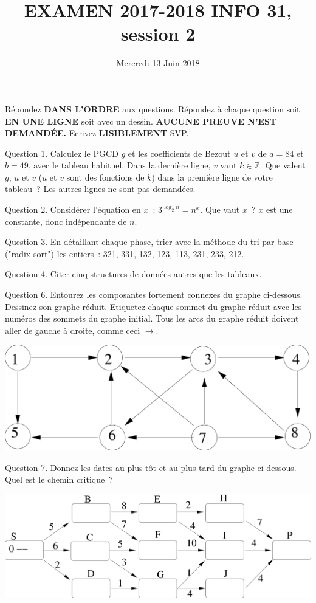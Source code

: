 \documentclass[a4paper,12pt]{article}
\def\Z{\mathbb{Z}}
\begin{document}
\title{EXAMEN 2017-2018 INFO 31, session 2}
\date{Mercredi 13 Juin 2018}
\maketitle
Répondez {\bf DANS L'ORDRE} aux questions. Répondez à chaque question soit {\bf EN UNE LIGNE} soit avec un dessin. {\bf AUCUNE PREUVE N'EST DEMANDÉE.} Ecrivez 
{\bf LISIBLEMENT} SVP.

Question 1. Calculez le PGCD $g$ et les coefficients de Bezout $u$ et $v$ de $a=84$ et $b=49$, avec le tableau habituel.
Dans la dernière ligne,  $v$ vaut $k\in\Z$.
Que valent $g$,  $u$ et $v$ ($u$ et $v$ sont des fonctions de $k$) dans la première ligne de votre tableau~? Les autres lignes ne sont pas demandées.

Question 2. Considérer l'équation en $x$~: $3^{\log_2 n}=n^x$.  Que vaut $x$~?
$x$ est une constante, donc indépendante de $n$. 

Question 3. En détaillant chaque phase, trier avec la méthode du tri par base ("radix sort") les entiers~: 321, 331, 132, 123, 113, 231, 233, 212.

Question 4. Citer cinq structures de données autres que les tableaux.


{Question 6. Entourez les composantes fortement connexes du graphe ci-dessous.
Dessinez son graphe réduit. Etiquetez chaque sommet
du graphe réduit avec les numéros des sommets du graphe initial. Tous les arcs du graphe réduit  doivent aller de gauche à droite, comme ceci $\rightarrow$.
\begin{center}
\includegraphics[width=0.65\linewidth]{graphe2018.pdf}
\end{center}
}

Question 7. Donnez les dates au plus tôt et au plus tard du graphe ci-dessous. Quel est le chemin critique~?
\begin{center}
\includegraphics[width=0.8\linewidth]{critic2018.pdf}
\end{center}
\end{document}

